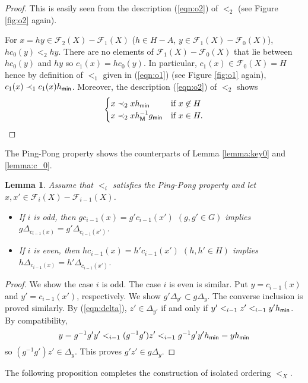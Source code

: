 \documentclass[10pt]{amsart}
\newtheorem{lemma}[theorem]{Lemma}
\numberwithin{equation}{section}
\begin{document}
\begin{proof}
This is easily seen from the description (\ref{eqn:o2}) of $<_{2}$ (see Figure \ref{fig:o2} again).

For $x=hy \in {\mathcal{F}}_{2}(X)-{\mathcal{F}}_{1}(X)$ ($h \in H-A$, $y \in {\mathcal{F}}_{1}(X)-{\mathcal{F}}_{0}(X)$), 
 $hc_{0}(y) <_{2} hy$. There are no elements of ${\mathcal{F}}_{1}(X)-{\mathcal{F}}_{0}(X)$ that lie between $hc_{0}(y)$ and $hy$ so $c_{1}(x)=hc_{0}(y)$. In particular, $c_{1}(x) \in {\mathcal{F}}_{0}(X)=H$ hence by definition of $<_{1}$ given in (\ref{eqn:o1}) (see Figure \ref{fig:o1} again), $c_{1}(x) \prec_{1} c_{1}(x)h_{\sf min}$. Moreover, the description (\ref{eqn:o2}) of $<_{2}$ shows
\begin{gather*}
\begin{cases}
x \prec_{2} x h_{\sf min} & \text{if } x \not \in H \\
x \prec_{2} xh_{\sf M}^{-1}g_{\sf min} & \text{if } x \in H.
\end{cases}
\end{gather*}
\end{proof}

The Ping-Pong property shows the counterparts of Lemma \ref{lemma:key0} and  \ref{lemma:c_0}.
\begin{lemma}
\label{lemma:pp1}
Assume that $<_{i}$ satisfies the Ping-Pong property and let $x,x'\in {\mathcal{F}}_{i}(X)-{\mathcal{F}}_{i-1}(X)$. 
\begin{itemize}
\item If $i$ is odd, then $gc_{i-1}(x) = g'c_{i-1}(x')$ $(g,g' \in G)$ implies $g\Delta_{c_{i-1}(x)} = g'\Delta_{c_{i-1}(x')}$.
\item If $i$ is even, then $hc_{i-1}(x) = h'c_{i-1}(x')$ $(h,h' \in H)$ implies $h\Delta_{c_{i-1}(x)} = h'\Delta_{c_{i-1}(x')}$.
\end{itemize}
\end{lemma}
\begin{proof}
We show the case $i$ is odd. The case $i$ is even is similar.
Put $y= c_{i-1}(x)$ and $y'=c_{i-1}(x')$, respectively. 
We show $g' \Delta_{y'} \subset g \Delta_{y}$. The converse inclusion is proved similarly. By (\ref{eqn:delta}), $z' \in \Delta_{y'}$ if and only if $y' <_{i-1} z' <_{i-1} y'h_{\sf min}$. By compatibility,
\[ y = g^{-1}g'y' <_{i-1} (g^{-1}g')z' <_{i-1} g^{-1}g'y'h_{\sf min} = yh_{\sf min} \]
so $(g^{-1}g') z' \in \Delta_{y}$. This proves $g'z' \in g\Delta_{y}$.
\end{proof}

The following proposition completes the construction of isolated ordering $<_{X}$.
\end{document}
